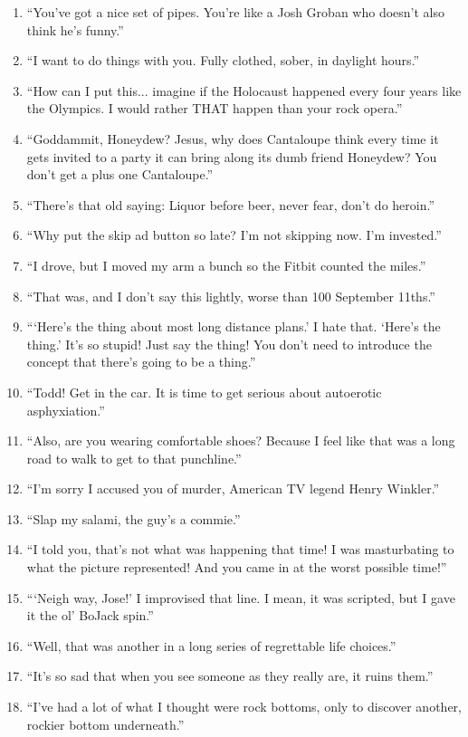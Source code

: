 \documentclass{book}
\numberwithin{equation}{section}
\begin{document}
\begin{enumerate}
    \item ``You've got a nice set of pipes. You're like a Josh Groban who doesn't also think he's funny.''
    \item ``I want to do things with you. Fully clothed, sober, in daylight hours.''
    \item ``How can I put this... imagine if the Holocaust happened every four years like the Olympics. I would rather THAT happen than your rock opera.''
    \item ``Goddammit, Honeydew? Jesus, why does Cantaloupe think every time it gets invited to a party it can bring along its dumb friend Honeydew? You don't get a plus one Cantaloupe.''
    \item ``There's that old saying: Liquor before beer, never fear, don't do heroin.''
    \item ``Why put the skip ad button so late? I'm not skipping now. I'm invested.''
    \item ``I drove, but I moved my arm a bunch so the Fitbit counted the miles.''
    \item ``That was, and I don't say this lightly, worse than 100 September 11ths.''
    \item ```Here's the thing about most long distance plans.' I hate that. `Here's the thing.' It's so stupid! Just say the thing! You don't need to introduce the concept that there's going to be a thing.''
    \item ``Todd! Get in the car. It is time to get serious about autoerotic asphyxiation.''
    \item ``Also, are you wearing comfortable shoes? Because I feel like that was a long road to walk to get to that punchline.''
    \item ``I'm sorry I accused you of murder, American TV legend Henry Winkler.''
    \item ``Slap my salami, the guy's a commie.''
    \item ``I told you, that's not what was happening that time! I was masturbating to what the picture represented! And you came in at the worst possible time!''
    \item ```Neigh way, Jose!' I improvised that line. I mean, it was scripted, but I gave it the ol' BoJack spin.''
    \item ``Well, that was another in a long series of regrettable life choices.''
    \item ``It's so sad that when you see someone as they really are, it ruins them.''
    \item ``I've had a lot of what I thought were rock bottoms, only to discover another, rockier bottom underneath.''

\end{enumerate}
\end{document}
